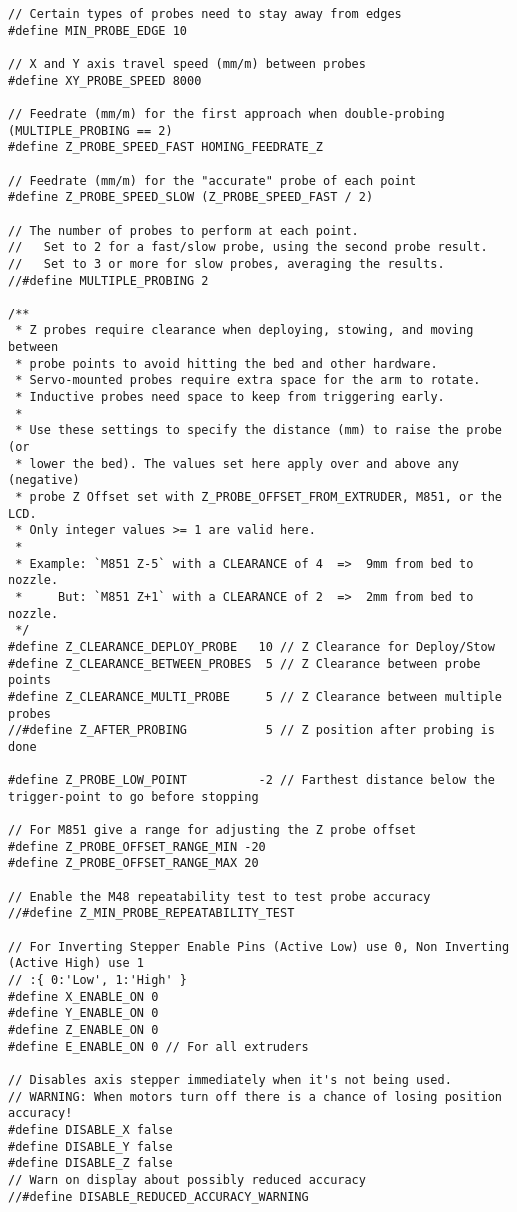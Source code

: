 \begin{lstlisting}
// Certain types of probes need to stay away from edges
#define MIN_PROBE_EDGE 10

// X and Y axis travel speed (mm/m) between probes
#define XY_PROBE_SPEED 8000

// Feedrate (mm/m) for the first approach when double-probing (MULTIPLE_PROBING == 2)
#define Z_PROBE_SPEED_FAST HOMING_FEEDRATE_Z

// Feedrate (mm/m) for the "accurate" probe of each point
#define Z_PROBE_SPEED_SLOW (Z_PROBE_SPEED_FAST / 2)

// The number of probes to perform at each point.
//   Set to 2 for a fast/slow probe, using the second probe result.
//   Set to 3 or more for slow probes, averaging the results.
//#define MULTIPLE_PROBING 2

/**
 * Z probes require clearance when deploying, stowing, and moving between
 * probe points to avoid hitting the bed and other hardware.
 * Servo-mounted probes require extra space for the arm to rotate.
 * Inductive probes need space to keep from triggering early.
 *
 * Use these settings to specify the distance (mm) to raise the probe (or
 * lower the bed). The values set here apply over and above any (negative)
 * probe Z Offset set with Z_PROBE_OFFSET_FROM_EXTRUDER, M851, or the LCD.
 * Only integer values >= 1 are valid here.
 *
 * Example: `M851 Z-5` with a CLEARANCE of 4  =>  9mm from bed to nozzle.
 *     But: `M851 Z+1` with a CLEARANCE of 2  =>  2mm from bed to nozzle.
 */
#define Z_CLEARANCE_DEPLOY_PROBE   10 // Z Clearance for Deploy/Stow
#define Z_CLEARANCE_BETWEEN_PROBES  5 // Z Clearance between probe points
#define Z_CLEARANCE_MULTI_PROBE     5 // Z Clearance between multiple probes
//#define Z_AFTER_PROBING           5 // Z position after probing is done

#define Z_PROBE_LOW_POINT          -2 // Farthest distance below the trigger-point to go before stopping

// For M851 give a range for adjusting the Z probe offset
#define Z_PROBE_OFFSET_RANGE_MIN -20
#define Z_PROBE_OFFSET_RANGE_MAX 20

// Enable the M48 repeatability test to test probe accuracy
//#define Z_MIN_PROBE_REPEATABILITY_TEST

// For Inverting Stepper Enable Pins (Active Low) use 0, Non Inverting (Active High) use 1
// :{ 0:'Low', 1:'High' }
#define X_ENABLE_ON 0
#define Y_ENABLE_ON 0
#define Z_ENABLE_ON 0
#define E_ENABLE_ON 0 // For all extruders

// Disables axis stepper immediately when it's not being used.
// WARNING: When motors turn off there is a chance of losing position accuracy!
#define DISABLE_X false
#define DISABLE_Y false
#define DISABLE_Z false
// Warn on display about possibly reduced accuracy
//#define DISABLE_REDUCED_ACCURACY_WARNING


\end{lstlisting}
